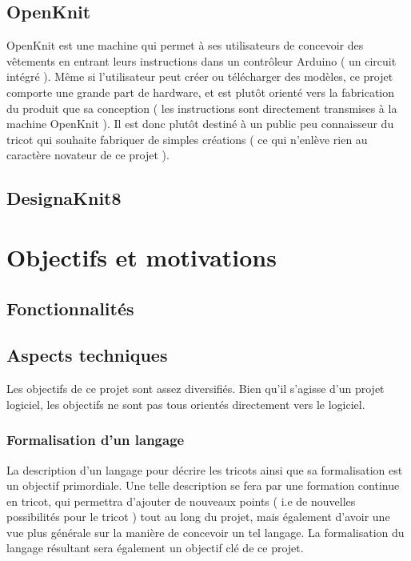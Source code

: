 \documentclass{article}
\begin{document}
\subsection{OpenKnit}

OpenKnit est une machine qui permet à ses utilisateurs de concevoir des vêtements en entrant leurs instructions dans un contrôleur Arduino 
( un circuit intégré ). Même si l'utilisateur peut créer ou télécharger des modèles, ce projet comporte une grande part de hardware, et est
plutôt orienté vers la fabrication du produit que sa conception ( les instructions sont directement transmises à la machine OpenKnit ). Il 
est donc plutôt destiné à un public peu connaisseur du tricot qui souhaite fabriquer de simples créations ( ce qui n'enlève rien au 
caractère novateur de ce projet ). 

\subsection{DesignaKnit8}

\section{Objectifs et motivations}

\subsection{Fonctionnalités}

\subsection{Aspects techniques}

Les objectifs de ce projet sont assez diversifiés. 
Bien qu'il s'agisse d'un projet logiciel, les objectifs ne sont pas tous orientés directement vers le logiciel.

\subsubsection{Formalisation d'un langage}

La description d'un langage pour décrire les tricots ainsi que sa formalisation est un objectif primordiale.
Une telle description se fera par une formation continue en tricot, qui permettra d'ajouter de nouveaux points ( i.e de nouvelles
possibilités pour le tricot ) tout au long du projet, mais également d'avoir une vue plus générale sur la manière de concevoir un tel
langage. La formalisation du langage résultant sera également un objectif clé de ce projet.
\end{document}
